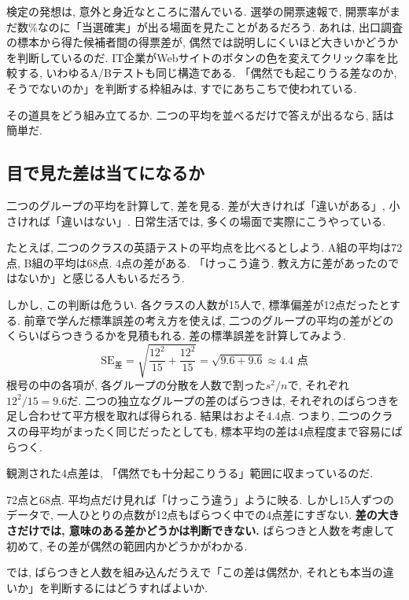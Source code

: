     検定の発想は, 意外と身近なところに潜んでいる.
    選挙の開票速報で, 開票率がまだ数\%なのに「当選確実」が出る場面を見たことがあるだろう.
    あれは, 出口調査の標本から得た候補者間の得票差が, 偶然では説明しにくいほど大きいかどうかを判断しているのだ.
    IT企業がWebサイトのボタンの色を変えてクリック率を比較する, いわゆるA/Bテストも同じ構造である.
    「偶然でも起こりうる差なのか, そうでないのか」を判断する枠組みは, すでにあちこちで使われている.

    その道具をどう組み立てるか.
    二つの平均を並べるだけで答えが出るなら, 話は簡単だ.


  \subsection{目で見た差は当てになるか}

    二つのグループの平均を計算して, 差を見る.
    差が大きければ「違いがある」, 小さければ「違いはない」.
    日常生活では, 多くの場面で実際にこうやっている.

    たとえば, 二つのクラスの英語テストの平均点を比べるとしよう.
    A組の平均は72点, B組の平均は68点.
    4点の差がある.
    「けっこう違う. 教え方に差があったのではないか」と感じる人もいるだろう.

    しかし, この判断は危うい.
    各クラスの人数が15人で, 標準偏差が12点だったとする.
    前章で学んだ標準誤差の考え方を使えば, 二つのグループの平均の差がどのくらいばらつきうるかを見積もれる.
    差の標準誤差を計算してみよう.
    \[
      \mathrm{SE}_{\text{差}} = \sqrt{\frac{12^2}{15} + \frac{12^2}{15}} = \sqrt{9.6 + 9.6} \approx 4.4 \text{ 点}
    \]
    根号の中の各項が, 各グループの分散を人数で割った$s^2 / n$で, それぞれ$12^2 / 15 = 9.6$だ.
    二つの独立なグループの差のばらつきは, それぞれのばらつきを足し合わせて平方根を取れば得られる.
    結果はおよそ4.4点.
    つまり, 二つのクラスの母平均がまったく同じだったとしても, 標本平均の差は4点程度まで容易にばらつく.

    観測された4点差は, 「偶然でも十分起こりうる」範囲に収まっているのだ.

    72点と68点. 平均点だけ見れば「けっこう違う」ように映る.
    しかし15人ずつのデータで, 一人ひとりの点数が12点もばらつく中での4点差にすぎない.
    \textbf{差の大きさだけでは, 意味のある差かどうかは判断できない.}
    ばらつきと人数を考慮して初めて, その差が偶然の範囲内かどうかがわかる.

    では, ばらつきと人数を組み込んだうえで「この差は偶然か, それとも本当の違いか」を判断するにはどうすればよいか.


